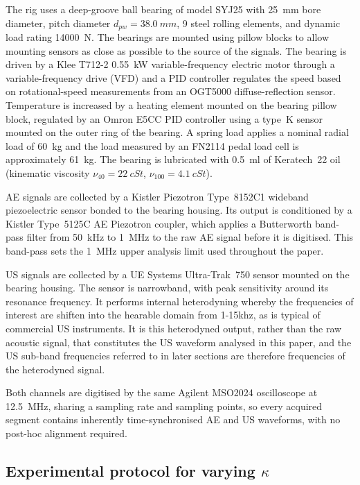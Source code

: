 The rig uses a deep-groove ball bearing of model SYJ25 with \SI{25}{mm} bore diameter, pitch diameter $d_{pw} = \SI{38.0}{mm}$, 9 steel rolling elements, and dynamic load rating \SI{14000}{N}. The bearings are mounted using pillow blocks to allow mounting sensors as close as possible to the source of the signals. The bearing is driven by a Klee T712-2 \SI{0.55}{kW} variable-frequency electric motor through a variable-frequency drive (VFD) and a PID controller regulates the speed based on rotational-speed measurements from an OGT5000 diffuse-reflection sensor. Temperature is increased by a heating element mounted on the bearing pillow block, regulated by an Omron E5CC PID controller using a type~K sensor mounted on the outer ring of the bearing. A spring load applies a nominal radial load of \SI{60}{kg} and the load measured by an FN2114 pedal load cell is approximately \SI{61}{kg}. The bearing is lubricated with \SI{0.5}{ml} of Keratech~22 oil (kinematic viscosity $\nu_{40} = \SI{22}{cSt}$, $\nu_{100} = \SI{4.1}{cSt}$).

AE signals are collected by a Kistler Piezotron Type~8152C1 wideband piezoelectric sensor bonded to the bearing housing. Its output is conditioned by a Kistler Type~5125C AE Piezotron coupler, which applies a Butterworth band-pass filter from \SI{50}{kHz} to \SI{1}{MHz} to the raw AE signal before it is digitised. This band-pass sets the \SI{1}{MHz} upper analysis limit used throughout the paper.

US signals are collected by a UE Systems Ultra-Trak~750 sensor mounted on the bearing housing. The sensor is narrowband, with peak sensitivity around its resonance frequency. It performs internal heterodyning whereby the frequencies of interest are shiften into the hearable domain from 1-15khz, as is typical of commercial US instruments. It is this heterodyned output, rather than the raw acoustic signal, that constitutes the US waveform analysed in this paper, and the US sub-band frequencies referred to in later sections are therefore frequencies of the heterodyned signal.

Both channels are digitised by the same Agilent MSO2024 oscilloscope at \SI{12.5}{MHz}, sharing a sampling rate and sampling points, so every acquired segment contains inherently time-synchronised AE and US waveforms, with no post-hoc alignment required.

\subsection{Experimental protocol for varying $\kappa$}
\label{subsec:ops}

